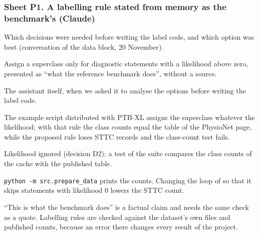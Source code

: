 \subsubsection*{Sheet P1. A labelling rule stated from memory as the benchmark's (Claude)}
\begin{description}[style=nextline,leftmargin=1.2em]
  \item[Prompt] Which decisions were needed before writing the label code, and which option was best
        (conversation of the data block, 20 November).
  \item[Faulty response] Assign a superclass only for diagnostic statements with a likelihood above zero,
        presented as ``what the reference benchmark does'', without a source.
  \item[Detected by] The assistant itself, when we asked it to analyse the options before writing the
        label code.
  \item[Proof] The example script distributed with PTB-XL assigns the superclass whatever the likelihood;
        with that rule the class counts equal the table of the PhysioNet page, while the proposed rule loses
        STTC records and the class-count test fails.
  \item[Correction] Likelihood ignored (decision D2); a test of the suite compares the class counts of the
        cache with the published table.
  \item[Reproduction] \texttt{python -m src.prepare\_data} prints the counts. Changing the loop of
         so that it skips statements with likelihood 0 lowers the STTC
        count.
  \item[Reflection] ``This is what the benchmark does'' is a factual claim and needs the same check as a
        quote. Labelling rules are checked against the dataset's own files and published counts, because an
        error there changes every result of the project.
\end{description}

